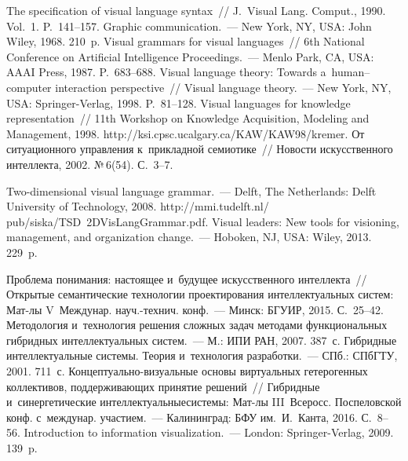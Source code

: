 \begin{multicols}{2}
{\small\frenchspacing
 {%
 \begin{thebibliography}{99}
   The specification of visual language syntax~// 
J.~Visual Lang. Comput., 1990. Vol.~1. P.~141--157.
   Graphic communication.~--- New York, NY, USA: John 
Wiley, 1968. 210~p. 
 Visual grammars for visual languages~// 6th National Conference on 
Artificial Intelligence Proceedings.~--- Menlo Park, CA, USA: AAAI 
Press, 1987. P.~683--688. 
   Visual language theory: Towards 
  a~human--computer interaction perspective~// Visual language theory.~--- New 
York, NY, USA: Springer-Verlag, 1998. P.~81--128.
   Visual languages for knowledge representation~//  
11th Workshop on Knowledge Acquisition, Modeling and Management, 1998. {\sf 
http://ksi.cpsc.\linebreak ucalgary.ca/KAW/KAW98/kremer}.
   От ситуационного управления к~прикладной семиотике~// 
Новости искусственного интеллекта, 2002. №\,6(54). С.~3--7. 

    Two-dimensional visual language 
grammar.~--- Delft, The Netherlands: Delft University of Technology, 
2008. {\sf http://mmi.tudelft.nl/ pub/siska/TSD~2DVisLangGrammar.pdf}.
 Visual leaders: New tools for visioning, management, and 
organization change.~--- Hoboken, NJ, USA: Wiley, 2013. 229~p.
 
   Проблема понимания: настоящее и~будущее 
искусственного интеллекта~// Открытые семантические технологии 
проектирования интеллектуальных систем: Мат-лы V~Междунар. 
науч.-технич. конф.~--- Минск: БГУИР, 2015. С.~25--42.
   Методология и~технология решения 
сложных задач методами функциональных гибридных интеллектуальных  
сис\-тем.~--- М.: ИПИ РАН, 2007. 387~с.
   Гибридные интеллектуальные системы. Теория 
и~технология разработки.~--- СПб.: \mbox{СПбГТУ}, 2001. 711~с.
Кон\-цеп\-ту\-аль\-но-ви\-зу\-аль\-ные основы виртуальных гетерогенных 
коллективов, поддерживающих принятие решений~// Гиб\-рид\-ные 
и~синергетические интеллектуальные\linebreak системы: Мат-лы III~Всеросс. 
Поспеловской конф. с~междунар. участием.~--- Калининград: 
БФУ им.\ И.~Канта, 2016. С.~8--56.
   Introduction to information visualization.~--- London:  
Springer-Verlag, 2009. 139~p.



\end{thebibliography}}}
\end{multicols}
